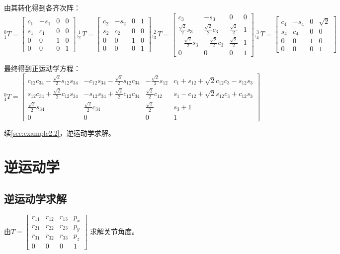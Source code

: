 \documentclass[
12pt, %
a4paper, 
oneside, %
headinclude,footinclude, %
]{scrartcl}
\begin{document}
{\footnotesize
由其转化得到各齐次阵：
$$
^0_1T = \begin{bmatrix} c_1 & -s_1 & 0 & 0 \\ s_1 & c_1 & 0 & 0 \\ 0 & 0 & 1 & 0 \\ 0 & 0 & 0 & 1 \end{bmatrix},
^1_2T = \begin{bmatrix} c_2 & -s_2 & 0 & 1 \\ s_2 & c_2 & 0 & 0 \\ 0 & 0 & 1 & 0 \\ 0 & 0 & 0 & 1 \end{bmatrix},
^2_3T = \begin{bmatrix} c_3 & -s_3 & 0 & 0 \\ \frac{\sqrt{2}}{2}s_3 & \frac{\sqrt{2}}{2}c_3 & \frac{\sqrt{2}}{2} & 1 \\ -\frac{\sqrt{2}}{2}s_3 & -\frac{\sqrt{2}}{2}c_3 & \frac{\sqrt{2}}{2} & 1 \\ 0 & 0 & 0 & 1 \end{bmatrix},
^3_4T = \begin{bmatrix} c_4 & -s_4 & 0 & \sqrt{2} \\ s_4 & c_4 & 0 & 0 \\ 0 & 0 & 1 & 0 \\ 0 & 0 & 0 & 1 \end{bmatrix}
$$

最终得到正运动学方程：
$$
^0_4T = 
\begin{bmatrix}
c_{12}c_{34} - \frac{\sqrt{2}}{2}s_{12}s_{34} & -c_{12}s_{34} - \frac{\sqrt{2}}{2}s_{12}c_{34} & -\frac{\sqrt{2}}{2}s_{12} & c_1 + s_{12} + \sqrt{2}c_{12}c_3 - s_{12}s_3 \\
s_{12}c_{34} + \frac{\sqrt{2}}{2}c_{12}s_{34} & -s_{12}s_{34} + \frac{\sqrt{2}}{2}c_{12}c_{34} & \frac{\sqrt{2}}{2}c_{12} & s_1 - c_{12} + \sqrt{2}s_{12}c_3 + c_{12}s_3 \\
\frac{\sqrt{2}}{2}s_{34} & \frac{\sqrt{2}}{2}c_{34} & \frac{\sqrt{2}}{2} & s_3 + 1 \\
0 & 0 & 0 & 1
\end{bmatrix}
$$

续\ref{sec:example2.2}，逆运动学求解。
}
\section{逆运动学}
\subsection{逆运动学求解}
由$ T = \begin{bmatrix} r_{11} & r_{12} & r_{13} & p_x \\ r_{21} & r_{22} & r_{23} & p_y \\ r_{31} & r_{32} & r_{33} & p_z \\ 0 & 0 & 0 & 1 \end{bmatrix} $
求解关节角度。
\end{document}
